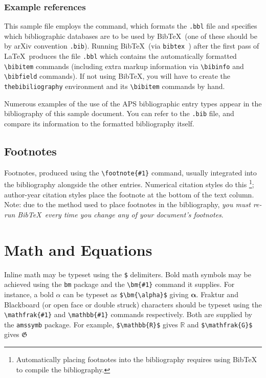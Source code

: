 \documentclass[%
 reprint,
 amsmath,amssymb,
 aps,
]{revtex4-2}
\begin{document}
  \subsubsection{Example references}
  This sample file employs the \verb++ command, 
  which formats the \texttt{\jobname .bbl} file
  and specifies which bibliographic databases are to be used by Bib\TeX\ 
  (one of these should be by arXiv convention \texttt{\jobname .bib}).
  Running Bib\TeX\ (via \texttt{bibtex \jobname}) 
  after the first pass of \LaTeX\ produces the file
  \texttt{\jobname .bbl} which contains the automatically formatted
  \verb+\bibitem+ commands (including extra markup information via
  \verb+\bibinfo+ and \verb+\bibfield+ commands). 
  If not using Bib\TeX, you will have to create the \verb+thebibiliography+ environment 
  and its \verb+\bibitem+ commands by hand.

  Numerous examples of the use of the APS bibliographic entry types appear in the bibliography of this sample document.
  You can refer to the \texttt{\jobname .bib} file, 
  and compare its information to the formatted bibliography itself.

  \subsection{Footnotes}%
  Footnotes, produced using the \verb+\footnote{#1}+ command, 
  usually integrated into the bibliography alongside the other entries.
  Numerical citation styles do this%
  \footnote{Automatically placing footnotes into the bibliography requires using BibTeX to compile the bibliography.};
  author-year citation styles place the footnote at the bottom of the text column.
  Note: due to the method used to place footnotes in the bibliography, 
  \emph{you must re-run Bib\TeX\ every time you change any of your document's footnotes}. 

  \section{Math and Equations}
  Inline math may be typeset using the \verb+$+ delimiters. Bold math
  symbols may be achieved using the \verb+bm+ package and the
  \verb+\bm{#1}+ command it supplies. For instance, a bold $\alpha$ can
  be typeset as \verb+$\bm{\alpha}$+ giving $\bm{\alpha}$. Fraktur and
  Blackboard (or open face or double struck) characters should be
  typeset using the \verb+\mathfrak{#1}+ and \verb+\mathbb{#1}+ commands
  respectively. Both are supplied by the \texttt{amssymb} package. For
  example, \verb+$\mathbb{R}$+ gives $\mathbb{R}$ and
  \verb+$\mathfrak{G}$+ gives $\mathfrak{G}$
\end{document}
